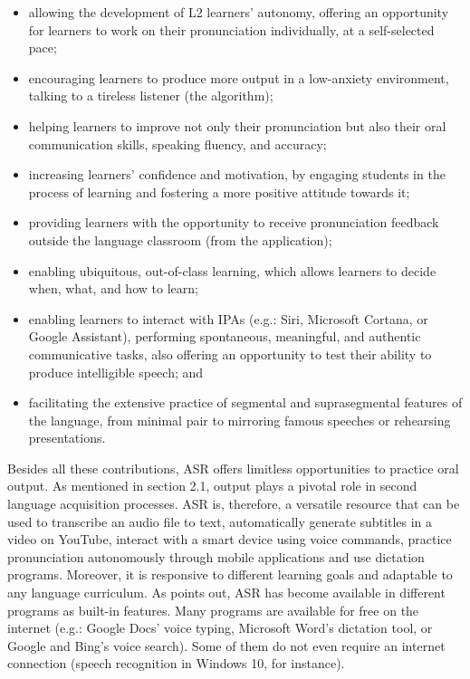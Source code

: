 \documentclass[english]{textolivre}
\begin{document}
\begin{itemize}
    \item allowing the development of L2 learners’ autonomy, offering an opportunity for learners to work on their pronunciation individually, at a self-selected pace;
    \item encouraging learners to produce more output in a low-anxiety environment, talking to a tireless listener (the algorithm);
    \item helping learners to improve not only their pronunciation but also their oral communication skills, speaking fluency, and accuracy;
    \item increasing learners’ confidence and motivation, by engaging students in the process of learning and fostering a more positive attitude towards it;
    \item providing learners with the opportunity to receive pronunciation feedback outside the language classroom (from the application);
    \item enabling ubiquitous, out-of-class learning, which allows learners to decide when, what, and how to learn;
    \item enabling learners to interact with IPAs (e.g.: Siri, Microsoft Cortana, or Google Assistant), performing spontaneous, meaningful, and authentic communicative tasks, also offering an opportunity to test their ability to produce intelligible speech; and
    \item facilitating the extensive practice of segmental and suprasegmental features of the language, from minimal pair to mirroring famous speeches or rehearsing presentations.
\end{itemize}

Besides all these contributions, ASR offers limitless opportunities to practice oral output. As mentioned in section 2.1, output plays a pivotal role in second language acquisition processes. ASR is, therefore, a versatile resource that can be used to transcribe an audio file to text, automatically generate subtitles in a video on YouTube, interact with a smart device using voice commands, practice pronunciation autonomously through mobile applications and use dictation programs. Moreover, it is responsive to different learning goals and adaptable to any language curriculum. As \textcite{yoshida2018} points out, ASR has become available in different programs as built-in features. Many programs are available for free on the internet (e.g.: Google Docs’ voice typing, Microsoft Word’s dictation tool, or Google and Bing’s voice search). Some of them do not even require an internet connection (speech recognition in Windows 10, for instance).
\end{document}
